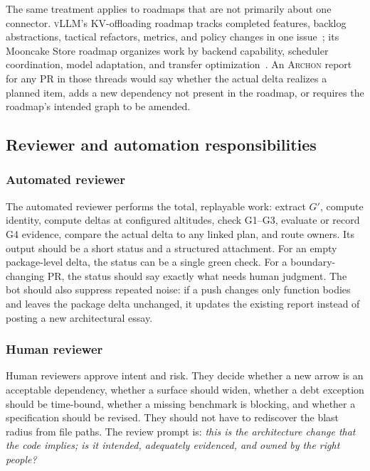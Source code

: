\documentclass[sigconf,review,anonymous]{acmart}
\theoremstyle{plain}
\theoremstyle{definition}
\begin{document}
The same treatment applies to roadmaps that are not primarily about one
connector. \textsc{vLLM}'s KV-offloading roadmap tracks completed features,
backlog abstractions, tactical refactors, metrics, and policy changes in one
issue~\cite{vllmkvoffloading}; its Mooncake Store roadmap organizes work by
backend capability, scheduler coordination, model adaptation, and transfer
optimization~\cite{vllmmooncakeroadmap}. An \textsc{Archon} report for any PR in
those threads would say whether the actual delta realizes a planned item, adds a
new dependency not present in the roadmap, or requires the roadmap's intended
graph to be amended.

\subsection{Reviewer and automation responsibilities}

\subsubsection{Automated reviewer}

The automated reviewer performs the total, replayable work: extract $G'$,
compute identity, compute deltas at configured altitudes, check G1--G3, evaluate
or record G4 evidence, compare the actual delta to any linked plan, and route
owners. Its output should be a short status and a structured attachment. For an
empty package-level delta, the status can be a single green check. For a
boundary-changing PR, the status should say exactly what needs human judgment.
The bot should also suppress repeated noise: if a push changes only function
bodies and leaves the package delta unchanged, it updates the existing report
instead of posting a new architectural essay.

\subsubsection{Human reviewer}

Human reviewers approve intent and risk. They decide whether a new arrow is an
acceptable dependency, whether a surface should widen, whether a debt exception
should be time-bound, whether a missing benchmark is blocking, and whether a
specification should be revised. They should not have to rediscover the blast
radius from file paths. The review prompt is: \emph{this is the architecture
change that the code implies; is it intended, adequately evidenced, and owned by
the right people?}
\end{document}
